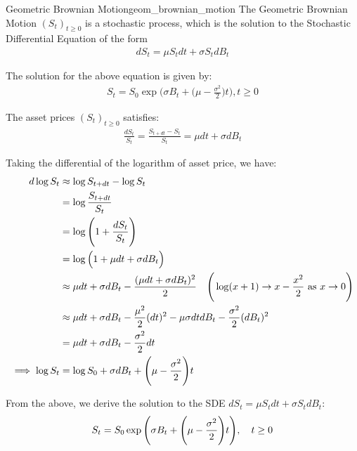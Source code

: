 \begin{proposition}{Geometric Brownian Motion}{geom_brownian_motion}
    The Geometric Brownian Motion $(S_t)_{t\ge 0}$ is a stochastic process, which is the solution to the Stochastic Differential Equation of the form
    \begin{align*}
        dS_t = \mu S_t dt + \sigma S_t dB_t
    \end{align*}

    \noindent The solution for the above equation is given by:
    \begin{align*}
        \boxed{
        S_t = S_0 \exp\Bigg( \sigma B_t + \Bigg( \mu - \frac{\sigma^2}{2} \Bigg)t \Bigg), t \ge 0
        }
    \end{align*}
\end{proposition}

\begin{proof*}
    The asset prices $(S_t)_{t\ge0}$ satisfies:
    \begin{align}
        \frac{dS_t}{S_t} = \frac{S_{t+dt} - S_t}{S_t} = \mu dt + \sigma dB_t
    \end{align}

    \noindent Taking the differential of the logarithm of asset price, we have:
    \begin{align*}
        d\log S_t &\approx \log S_{t+dt} - \log S_t \\
            &= \log\frac{S_{t+dt}}{S_t} \\
            &= \log \Bigg( 
                1 + \frac{dS_t}{S_t}
             \Bigg) \\
            &= \log \Big(  1 + \mu dt + \sigma dB_t  \Big) \\
            &\approx \mu dt + \sigma dB_t - \frac{(\mu dt + \sigma dB_t)^2}{2} \ \ \ \Bigg( \log(x+1) \to x - \frac{x^2}{2} \text{ as } x \to 0 \Bigg) \\
            &\approx \mu dt + \sigma dB_t - \frac{\mu^2}{2}(dt)^2 - \mu\sigma dtdB_t - \frac{\sigma^2}{2}(dB_t)^2 \\
            &= \mu dt + \sigma dB_t - \frac{\sigma^2}{2}dt \\
        \implies
        \log S_t &= \log S_0 + \sigma dB_t + \Bigg( 
            \mu - \frac{\sigma^2}{2}
         \Bigg)t
    \end{align*}

    \noindent From the above, we derive the solution to the SDE $dS_t = \mu S_tdt + \sigma S_t dB_t$:
    \begin{align}
        S_t = S_0 \exp\Bigg( 
            \sigma B_t + \Bigg( \mu - \frac{\sigma^2}{2} \Bigg)t
         \Bigg), \ \ \ t \ge 0
    \end{align}
\end{proof*}


